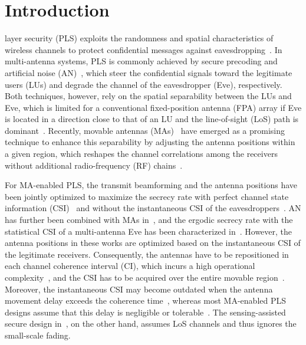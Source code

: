 \documentclass[journal]{IEEEtran}
\begin{document}
\section{Introduction}\label{sec:intro}
 layer security (PLS) exploits the randomness and spatial characteristics of wireless channels to protect confidential messages against eavesdropping~\cite{Wyner1975,Mukherjee2014,WuJSAC2018}. In multi-antenna systems, PLS is commonly achieved by secure precoding and artificial noise (AN)~\cite{Goel2008,Zhou2010}, which steer the confidential signals toward the legitimate users (LUs) and degrade the channel of the eavesdropper (Eve), respectively. Both techniques, however, rely on the spatial separability between the LUs and Eve, which is limited for a conventional fixed-position antenna (FPA) array if Eve is located in a direction close to that of an LU and the line-of-sight (LoS) path is dominant~\cite{Mukherjee2014,HuSPL2024}. Recently, movable antennas (MAs)~\cite{ZhuMag2024,ZhuTWC2024Model} have emerged as a promising technique to enhance this separability by adjusting the antenna positions within a given region, which reshapes the channel correlations among the receivers without additional radio-frequency (RF) chains~\cite{MaTWC2024,ZhuTWC2024MU,ZhuCL2023}.

For MA-enabled PLS, the transmit beamforming and the antenna positions have been jointly optimized to maximize the secrecy rate with perfect channel state information (CSI)~\cite{HuSPL2024} and without the instantaneous CSI of the eavesdroppers~\cite{HuTMC2024}. AN has further been combined with MAs in~\cite{TangTCOM2025,ChengArxiv2024}, and the ergodic secrecy rate with the statistical CSI of a multi-antenna Eve has been characterized in~\cite{XieArxiv2026}. However, the antenna positions in these works are optimized based on the instantaneous CSI of the legitimate receivers. Consequently, the antennas have to be repositioned in each channel coherence interval (CI), which incurs a high operational complexity~\cite{ZhengTCOM2025}, and the CSI has to be acquired over the entire movable region~\cite{HuTVT2025}. Moreover, the instantaneous CSI may become outdated when the antenna movement delay exceeds the coherence time~\cite{ChenArxiv2025EE}, whereas most MA-enabled PLS designs assume that this delay is negligible or tolerable~\cite{YuArxiv2025}. The sensing-assisted secure design in~\cite{ChenArxiv2026}, on the other hand, assumes LoS channels and thus ignores the small-scale fading.
\end{document}
